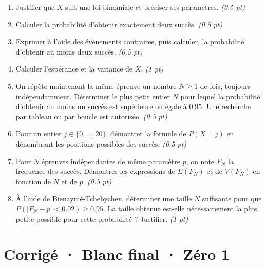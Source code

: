 \begin{enumerate}

\item Justifier que $X$ suit une loi binomiale et préciser ses paramètres. \hfill\textit{(\num{0,5} pt)}

\item Calculer la probabilité d'obtenir exactement deux succès. \hfill\textit{(\num{0,5} pt)}

\item Exprimer à l'aide des événements contraires, puis calculer, la probabilité d'obtenir au moins deux succès. \hfill\textit{(\num{0,5} pt)}

\item Calculer l'espérance et la variance de $X$. \hfill\textit{(1 pt)}

\item On répète maintenant la même épreuve un nombre $N\ge1$ de fois, toujours indépendamment. Déterminer le plus petit entier $N$ pour lequel la probabilité d'obtenir au moins un succès est supérieure ou égale à $\num{0,95}$. Une recherche par tableau ou par boucle est autorisée. \hfill\textit{(\num{0,5} pt)}

\item Pour un entier $j\in\{0,\ldots,20\}$, démontrer la formule de $P(X=j)$ en dénombrant les positions possibles des succès. \hfill\textit{(\num{0,5} pt)}

\item Pour $N$ épreuves indépendantes de même paramètre $p$, on note $F_N$ la fréquence des succès. Démontrer les expressions de $E(F_N)$ et de $V(F_N)$ en fonction de $N$ et de $p$. \hfill\textit{(\num{0,5} pt)}

\item À l'aide de Bienaymé-Tchebychev, déterminer une taille $N$ suffisante pour que $P(|F_N-p|<\num{0,02})\ge\num{0,95}$. La taille obtenue est-elle nécessairement la plus petite possible pour cette probabilité ? Justifier. \hfill\textit{(1 pt)}

\end{enumerate}

\ifmxteacher\mxnewpage

\section*{Corrigé · Blanc final · Zéro 1}\label{cor:9-1}

